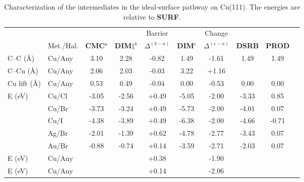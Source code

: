 \documentclass[aps,prl,reprint,amsmath,amssymb,floatfix,notitlepage]{revtex4-1}
\begin{document}
\begin{table}
\centering
\caption{Characterization of the intermediates in the ideal-surface pathway on Cu(111). %
The energies are relative to \textbf{SURF}.
}
\label{table:idealsurface}
\begin{tabular}{ llcccccccc  }
 \hline
 \hline
  & & &  & Barrier & & Change & &\\
  & Met./Hal. & \textbf{CMC}$^{a}$ & \textbf{DIM$\ddagger$}$^{b}$ & $\Delta^{(b-a)}$ &  \textbf{DIM}$^{c}$ & $\Delta^{(c-a)}$  & \textbf{DSRB} & \textbf{PROD} \\ 
 \hline 
 C--C (\si{\angstrom}) & Cu/Any & 3.10 & 2.28 & -0.82 & 1.49 & -1.61 & 1.49 & 1.49 \\ 
 \hline
 C--Cu (\si{\angstrom}) & Cu/Any & 2.06 & 2.03 & -0.03 & 3.22 & +1.16 & & \\
 \hline
 Cu lift (\si{\angstrom}) & Cu/Any & 0.53 & 0.49& -0.04  & 0.00 & -0.53 & 0.00 & 0.00 \\
 \hline
 \multirow{3}{*}{E (\si{\electronvolt}) } & Cu/Cl & -3.05 &-2.56 &+0.49 & -5.05 & -2.00& -3.33&0.85\\ 
 & Cu/Br & -3.73 & -3.24 &+0.49 & -5.73 & -2.00& -4.01&0.07\\ 
 & Cu/I  & -4.38 & -3.89 & +0.49 & -6.38 & -2.00& -4.66&-0.71\\ 
 \hline
 & Ag/Br & -2.01 & -1.39 & +0.62& -4.78 &-2.77 &-3.43 & 0.07\\ 
 \hline
 & Au/Br & -0.88 & -0.74 & +0.14& -3.59 &-2.71 &-2.03 & 0.07\\ 
 \hline
 E (\si{\electronvolt})~\cite{pccp2010} & Cu/Any &  &  & +0.38& & -1.90 & & \\
 \hline
 E (\si{\electronvolt})~\cite{jacs2013} & Cu/Any & &  & +0.14& & -2.06 & &\\
 \hline
 \hline
\end{tabular}
\end{table}
\end{document}
